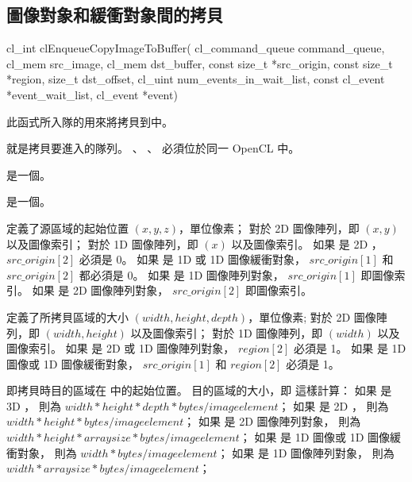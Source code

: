 \subsection{圖像對象和緩衝對象間的拷貝}


\startCLFUNC
cl_int clEnqueueCopyImageToBuffer(
			cl_command_queue command_queue,
			cl_mem src_image,
			cl_mem dst_buffer,
			const size_t *src_origin,
			const size_t *region,
			size_t dst_offset,
			cl_uint num_events_in_wait_list,
			const cl_event *event_wait_list,
			cl_event *event)
\stopCLFUNC

此函式所入隊的用來將拷貝到中。

 就是拷貝要進入的隊列。
、 、 
必須位於同一 OpenCL 中。

 是一個。

 是一個。

 定義了源區域的起始位置 $(x, y, z)$，單位像素；
對於 2D 圖像陣列，即 $(x, y)$ 以及圖像索引；
對於 1D 圖像陣列，即 $(x)$ 以及圖像索引。
如果  是 2D ， $src\_origin[2]$ 必須是 0。
如果  是 1D 或 1D 圖像緩衝對象，
$src\_origin[1]$ 和 $src\_origin[2]$ 都必須是 0。
如果  是 1D 圖像陣列對象， $src\_origin[1]$ 即圖像索引。
如果  是 2D 圖像陣列對象， $src\_origin[2]$ 即圖像索引。

 定義了所拷貝區域的大小 $(width, height, depth)$，單位像素;
對於 2D 圖像陣列，即 $(width, height)$ 以及圖像索引；
對於 1D 圖像陣列，即 $(width)$ 以及圖像索引。
如果  是 2D  或 1D 圖像陣列對象，
$region[2]$ 必須是 1。
如果  是 1D 圖像或 1D 圖像緩衝對象，
$src\_origin[1]$ 和 $region[2]$ 必須是 1。

 即拷貝時目的區域在  中的起始位置。
目的區域的大小，即  這樣計算：
如果  是 3D ，
則為 $width * height * depth * bytes/image element$；
如果  是 2D ，
則為 $width * height * bytes/image element$；
如果  是 2D 圖像陣列對象，
則為 $width * height * arraysize * bytes/image element$；
如果  是 1D 圖像或 1D 圖像緩衝對象，
則為 $width * bytes/image element$；
如果  是 1D 圖像陣列對象，
則為 $width * arraysize * bytes/image element$；


